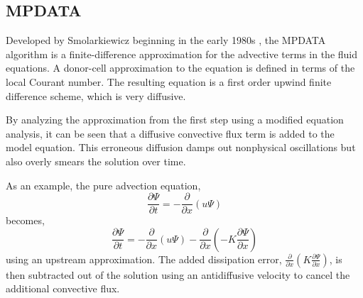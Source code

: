 \subsection{MPDATA}
\label{MPDATA}

Developed by Smolarkiewicz beginning in the early 1980s \cite{Smol84,Smol90,Smol06}, the MPDATA algorithm is a finite-difference approximation for the advective terms in the fluid equations. A donor-cell approximation to the equation is defined in terms of the local Courant number. The resulting equation is a first order upwind finite difference scheme, which is very diffusive.

By analyzing the approximation from the first step using a modified equation analysis, it can be seen that a diffusive convective flux term is added to the model equation. This erroneous diffusion damps out nonphysical oscillations but also overly smears the solution over time.

As an example, the pure advection equation,
\[
\frac{\partial \Psi}{\partial t} = -\frac{\partial}{\partial x}(u\Psi)
\]
becomes,
\[
\frac{\partial \Psi}{\partial t} = -\frac{\partial}{\partial x}(u\Psi)-\frac{\partial}{\partial x}\left(-K\frac{\partial \Psi}{\partial x}\right)
\]
using an upstream approximation. The added dissipation error, $\frac{\partial}{\partial x}\left(K\frac{\partial \Psi}{\partial x}\right)$, is then subtracted out of the solution using an antidiffusive velocity to cancel the additional convective flux. 